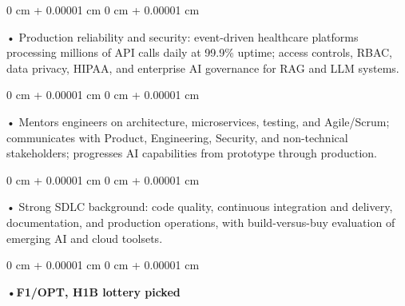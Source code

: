 \documentclass[10pt, letterpaper]{article}
\newenvironment{onecolentry}{
    \begin{adjustwidth}{
        0 cm + 0.00001 cm
    }{
        0 cm + 0.00001 cm
    }
}{
    \end{adjustwidth}
} %
\begin{document}
        \begin{onecolentry}
            • Production reliability and security: event-driven healthcare platforms processing millions of API calls daily at 99.9\% uptime; access controls, RBAC, data privacy, HIPAA, and enterprise AI governance for RAG and LLM systems.
        \end{onecolentry}
        \begin{onecolentry}
            • Mentors engineers on architecture, microservices, testing, and Agile/Scrum; communicates with Product, Engineering, Security, and non-technical stakeholders; progresses AI capabilities from prototype through production.
        \end{onecolentry}
        \begin{onecolentry}
            • Strong SDLC background: code quality, continuous integration and delivery, documentation, and production operations, with build-versus-buy evaluation of emerging AI and cloud toolsets.
        \end{onecolentry}
        \begin{onecolentry}
                \textbf{•F1/OPT, H1B lottery picked}
        \end{onecolentry}

    \vspace{2 pt }
\end{document}
